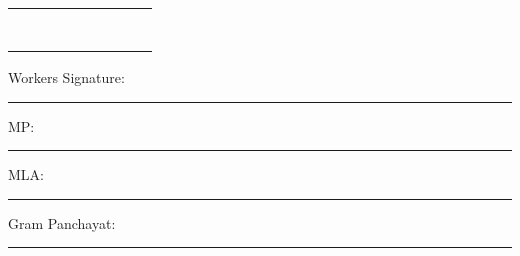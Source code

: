 \documentclass[10pt]{article}
\begin{document}
\begin{longtable}{|l|p{3.0cm}|l|l|l|p{3.0cm}|p{3.0cm}|l|l|}
\rule{0cm}{0.65cm} & \relax & \relax & \relax & \relax & \relax & \relax & \relax & \\ \hline
\rule{0cm}{0.65cm} & \relax & \relax & \relax & \relax & \relax & \relax & \relax & \\ \hline
\rule{0cm}{0.65cm} & \relax & \relax & \relax & \relax & \relax & \relax & \relax & \\ \hline
\rule{0cm}{0.65cm} & \relax & \relax & \relax & \relax & \relax & \relax & \relax & \\ \hline
\rule{0cm}{0.65cm} & \relax & \relax & \relax & \relax & \relax & \relax & \relax & \\ \hline
\rule{0cm}{0.65cm} & \relax & \relax & \relax & \relax & \relax & \relax & \relax & \\ \hline
\rule{0cm}{0.65cm} & \relax & \relax & \relax & \relax & \relax & \relax & \relax & \\ \hline
\rule{0cm}{0.65cm} & \relax & \relax & \relax & \relax & \relax & \relax & \relax & \\ \hline
\end{longtable}

\newline
\newline
Workers Signature: \rule{4cm}{0.3pt}  
\newline
\newline
\newline
MP: \rule{4cm}{0.3pt}  MLA: \rule{4cm}{0.3pt} Gram Panchayat: \rule{4cm}{0.3pt}
\end{document}
